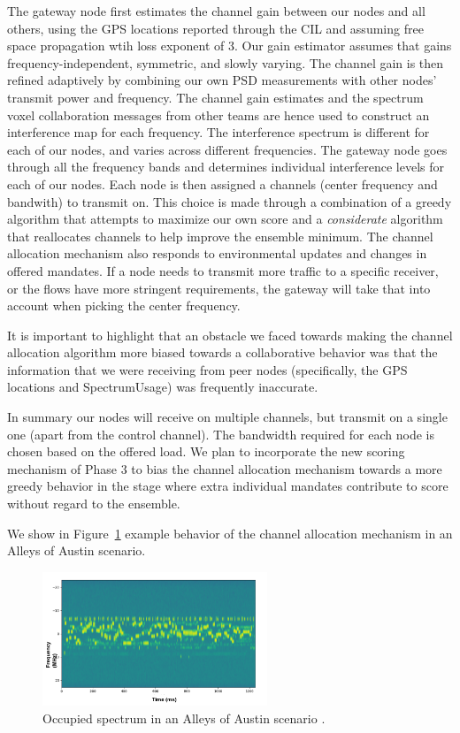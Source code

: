 \documentclass[11pt]{article}
\begin{document}
The
gateway node first estimates the channel gain between our nodes and all others, using the GPS locations reported through the CIL and assuming free space propagation wtih loss exponent of 3. Our gain estimator assumes that gains frequency-independent, symmetric, and slowly varying. The channel gain is then refined adaptively by combining our own PSD measurements with other nodes' transmit power and frequency. The channel gain estimates and the spectrum voxel collaboration messages from other teams are
hence used to construct an interference map for each frequency. The interference spectrum is different
for each of our nodes, and varies across different frequencies. The gateway node goes through all the
frequency bands and determines individual interference levels for each of our nodes. Each node is then assigned a channels (center frequency and bandwith) to transmit on. This choice is made through a combination of a greedy algorithm that attempts to maximize our own score and a \emph{considerate} algorithm that reallocates channels to help improve the ensemble minimum. The channel allocation mechanism also responds to environmental updates and changes in offered mandates. If  a  node  needs  to  transmit  more  traffic  to  a  specific  receiver,  or  the  flows  have  more  stringent requirements, the gateway will take that into account when picking the center frequency.

It is important to highlight that an obstacle we faced towards making the channel allocation algorithm more biased towards a collaborative behavior was that the information that we were receiving from peer nodes (specifically, the GPS locations and SpectrumUsage) was frequently inaccurate.
 
In summary our nodes will receive on multiple channels, but transmit on a single one (apart from the control channel). The bandwidth required for each node is chosen based on the offered load. We plan to incorporate the new scoring mechanism of Phase 3 to bias the channel allocation mechanism towards a more greedy behavior in the stage where extra individual mandates contribute to score without regard to the ensemble.

We show in Figure~\ref{fig:channelalloc} example behavior of the channel allocation mechanism in an Alleys of Austin scenario.

\begin{figure} [htb]
     \centerline{
     \includegraphics[width = 0.6\textwidth]{Figures/ChanAllocEx.png}}
     \caption{Occupied spectrum in an Alleys of Austin scenario \cite[Figure $9$]{func-report}.}
     \label{fig:channelalloc}
     \end{figure}
     
\end{document}
